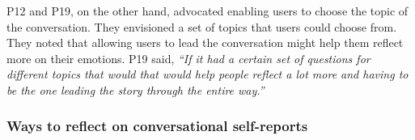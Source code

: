         
        P12 and P19, on the other hand, advocated enabling users to choose the topic of the conversation. They envisioned a set of topics that users could choose from. They noted that allowing users to lead the conversation might help them reflect more on their emotions. 
        P19 said,
        \textit{``If it had a certain set of questions for different topics that would that would help people reflect a lot more and having to be the one leading the story through the entire way.''}




    
    \subsubsection{Ways to reflect on conversational self-reports}
        
